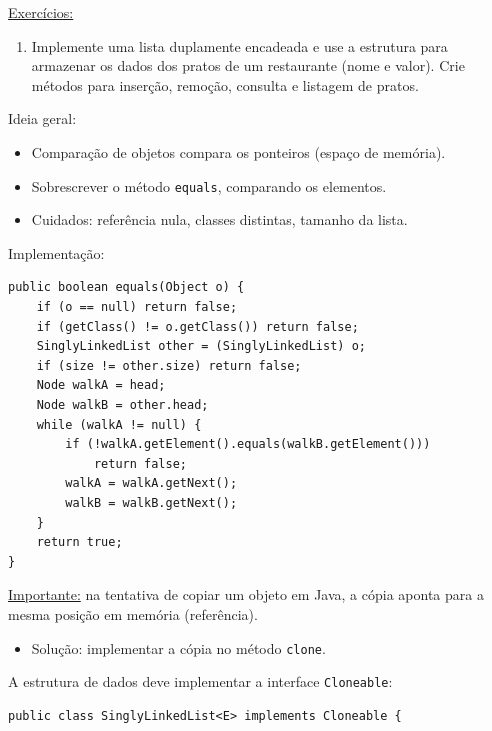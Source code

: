 \medskip

\underline{Exercícios:}
\begin{enumerate}
	\item Implemente uma lista duplamente encadeada e use a estrutura para armazenar os dados dos pratos de um restaurante (nome e valor). Crie métodos para inserção, remoção, consulta e listagem de pratos.
\end{enumerate}

\medskip


Ideia geral:
\begin{itemize}
	\item Comparação de objetos compara os ponteiros (espaço de memória).
	\item Sobrescrever o método \texttt{equals}, comparando os elementos.
	\item Cuidados: referência nula, classes distintas, tamanho da lista.
\end{itemize}

\medskip

Implementação:
\begin{verbatim}
public boolean equals(Object o) {
	if (o == null) return false;
	if (getClass() != o.getClass()) return false;
	SinglyLinkedList other = (SinglyLinkedList) o;
	if (size != other.size) return false;
	Node walkA = head;
	Node walkB = other.head;
	while (walkA != null) {
		if (!walkA.getElement().equals(walkB.getElement()))
			return false;
		walkA = walkA.getNext();
		walkB = walkB.getNext();
	}
	return true;
}
\end{verbatim}

\medskip


\underline{Importante:} na tentativa de copiar um objeto em Java, a cópia aponta para a mesma posição em memória (referência).
\begin{itemize}
	\item Solução: implementar a cópia no método \texttt{clone}.
\end{itemize}

\medskip

A estrutura de dados deve implementar a interface \texttt{Cloneable}:
\begin{verbatim}
public class SinglyLinkedList<E> implements Cloneable {
\end{verbatim}

\medskip

